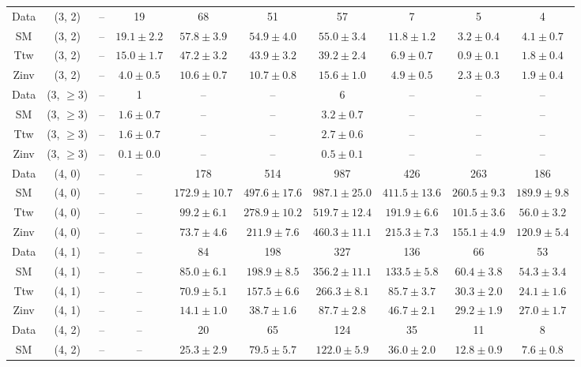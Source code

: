 \begin{table}[h!]
{\begin{tabular}{cccccccccc}
	Data & (3, 2) & -- & 19 & 68 & 51 & 57 & 7 & 5 & 4 \\[0.5ex] 
	SM & (3, 2) & -- & $19.1\pm 2.2$ & $57.8\pm 3.9$ & $54.9\pm 4.0$ & $55.0\pm 3.4$ & $11.8\pm 1.2$ & $3.2\pm 0.4$ & $4.1\pm 0.7$ \\[0.5ex] 
	Ttw & (3, 2) & -- & $15.0\pm 1.7$ & $47.2\pm 3.2$ & $43.9\pm 3.2$ & $39.2\pm 2.4$ & $6.9\pm 0.7$ & $0.9\pm 0.1$ & $1.8\pm 0.4$ \\[0.5ex] 
	Zinv & (3, 2) & -- & $4.0\pm 0.5$ & $10.6\pm 0.7$ & $10.7\pm 0.8$ & $15.6\pm 1.0$ & $4.9\pm 0.5$ & $2.3\pm 0.3$ & $1.9\pm 0.4$ \\[0.5ex] 
	Data & (3, $\ge3$) & -- & 1 & -- & -- & 6 & -- & -- & -- \\[0.5ex] 
	SM & (3, $\ge3$) & -- & $1.6\pm 0.7$ & -- & -- & $3.2\pm 0.7$ & -- & -- & -- \\[0.5ex] 
	Ttw & (3, $\ge3$) & -- & $1.6\pm 0.7$ & -- & -- & $2.7\pm 0.6$ & -- & -- & -- \\[0.5ex] 
	Zinv & (3, $\ge3$) & -- & $0.1\pm 0.0$ & -- & -- & $0.5\pm 0.1$ & -- & -- & -- \\[0.5ex] 
	Data & (4, 0) & -- & -- & 178 & 514 & 987 & 426 & 263 & 186 \\[0.5ex] 
	SM & (4, 0) & -- & -- & $172.9\pm 10.7$ & $497.6\pm 17.6$ & $987.1\pm 25.0$ & $411.5\pm 13.6$ & $260.5\pm 9.3$ & $189.9\pm 9.8$ \\[0.5ex] 
	Ttw & (4, 0) & -- & -- & $99.2\pm 6.1$ & $278.9\pm 10.2$ & $519.7\pm 12.4$ & $191.9\pm 6.6$ & $101.5\pm 3.6$ & $56.0\pm 3.2$ \\[0.5ex] 
	Zinv & (4, 0) & -- & -- & $73.7\pm 4.6$ & $211.9\pm 7.6$ & $460.3\pm 11.1$ & $215.3\pm 7.3$ & $155.1\pm 4.9$ & $120.9\pm 5.4$ \\[0.5ex] 
	Data & (4, 1) & -- & -- & 84 & 198 & 327 & 136 & 66 & 53 \\[0.5ex] 
	SM & (4, 1) & -- & -- & $85.0\pm 6.1$ & $198.9\pm 8.5$ & $356.2\pm 11.1$ & $133.5\pm 5.8$ & $60.4\pm 3.8$ & $54.3\pm 3.4$ \\[0.5ex] 
	Ttw & (4, 1) & -- & -- & $70.9\pm 5.1$ & $157.5\pm 6.6$ & $266.3\pm 8.1$ & $85.7\pm 3.7$ & $30.3\pm 2.0$ & $24.1\pm 1.6$ \\[0.5ex] 
	Zinv & (4, 1) & -- & -- & $14.1\pm 1.0$ & $38.7\pm 1.6$ & $87.7\pm 2.8$ & $46.7\pm 2.1$ & $29.2\pm 1.9$ & $27.0\pm 1.7$ \\[0.5ex] 
	Data & (4, 2) & -- & -- & 20 & 65 & 124 & 35 & 11 & 8 \\[0.5ex] 
	SM & (4, 2) & -- & -- & $25.3\pm 2.9$ & $79.5\pm 5.7$ & $122.0\pm 5.9$ & $36.0\pm 2.0$ & $12.8\pm 0.9$ & $7.6\pm 0.8$ \\[0.5ex] 

\end{tabular}}
\end{table}
